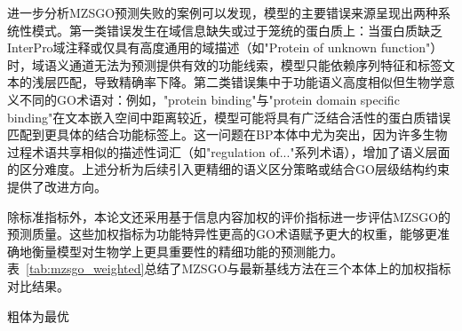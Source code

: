 进一步分析MZSGO预测失败的案例可以发现，模型的主要错误来源呈现出两种系统性模式。第一类错误发生在域信息缺失或过于笼统的蛋白质上：当蛋白质缺乏InterPro域注释或仅具有高度通用的域描述（如"Protein of unknown function"）时，域语义通道无法为预测提供有效的功能线索，模型只能依赖序列特征和标签文本的浅层匹配，导致精确率下降。第二类错误集中于功能语义高度相似但生物学意义不同的GO术语对：例如，"protein binding"与"protein domain specific binding"在文本嵌入空间中距离较近，模型可能将具有广泛结合活性的蛋白质错误匹配到更具体的结合功能标签上。这一问题在BP本体中尤为突出，因为许多生物过程术语共享相似的描述性词汇（如"regulation of..."系列术语），增加了语义层面的区分难度。上述分析为后续引入更精细的语义区分策略或结合GO层级结构约束提供了改进方向。

除标准指标外，本论文还采用基于信息内容加权的评价指标进一步评估MZSGO的预测质量。这些加权指标为功能特异性更高的GO术语赋予更大的权重，能够更准确地衡量模型对生物学上更具重要性的精细功能的预测能力。表~\ref{tab:mzsgo_weighted}总结了MZSGO与最新基线方法在三个本体上的加权指标对比结果。

\begin{table}[htbp]
\centering
\caption{加权评价指标在三个GO本体上的对比}
\label{tab:mzsgo_weighted}
\small
{}
\vspace{0.3em}

{\raggedright\footnotesize 粗体为最优\par}
\end{table}

